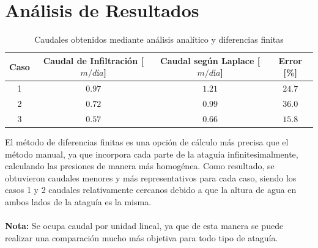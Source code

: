 \section{Análisis de Resultados}

\begin{table}[H]
    \centering
    \caption{Caudales obtenidos mediante análisis analítico y diferencias finitas}
    \vspace{0.5cm}
    \begin{tabular}{cccc}
        \hline
        \textbf{Caso} & \textbf{Caudal de Infiltración [$m/día$]} & \textbf{Caudal según Laplace [$m/día$]} & \textbf{Error [\%]} \\
        \hline
        1 & $0.97$ & $1.21$ & $24.7$ \\
        2 & $0.72$ & $0.99$ & $36.0$ \\
        3 & $0.57$ & $0.66$ & $15.8$ \\
        \hline
    \end{tabular}
    \label{tab:Diferencias1}
\end{table}

El método de diferencias finitas es una opción de cálculo más precisa que el método manual, ya que incorpora cada parte de la ataguía infinitesimalmente, calculando las presiones de manera más homogénea. Como resultado, se obtuvieron caudales menores y más representativos para cada caso, siendo los casos 1 y 2 caudales relativamente cercanos debido a que la altura de agua en ambos lados de la ataguía es la misma.
\\ \\
\textbf{Nota:} Se ocupa caudal por unidad lineal, ya que de esta manera se puede realizar una comparación mucho más objetiva para todo tipo de ataguía. 
